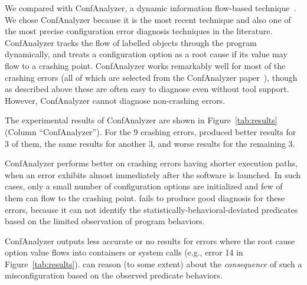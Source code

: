 We compared \ourtool with ConfAnalyzer, a dynamic information
flow-based technique~\cite{Rabkin:2011:PPC}.
We chose ConfAnalyzer because it is the most recent technique and
also one of the most precise configuration error diagnosis techniques
in the literature.
ConfAnalyzer tracks the flow of labelled objects through the
program dynamically,
and treats a configuration option as a root cause if its
value may flow to a crashing point.
ConfAnalyzer works remarkably well for most of the crashing errors (all of
which are selected from the ConfAnalyzer paper~\cite{Rabkin:2011:PPC}), though as
described above these are often easy to diagnose even without tool
support. However, ConfAnalyzer cannot diagnose non-crashing errors.

The experimental results of ConfAnalyzer are shown in Figure~\ref{tab:results} (Column ``ConfAnalyzer'').
For the 9 crashing errors, \ourtool produced better results for 3 of them,
the same results for another 3, and worse results for the remaining 3.

ConfAnalyzer performs better on crashing errors
having shorter execution paths, when an error exhibits
almost immediately after the software is launched.
In such cases, only a small number of configuration options are initialized and
few of them can flow to the crashing point. 
\ourtool fails to produce good diagnosis for these errors, because it can not identify
 the statistically-behavioral-deviated predicates based on the limited
observation of program behaviors.

ConfAnalyzer outputs less accurate or no results
for errors where the root cause option value
flows into containers or system calls (e.g., error 14 in Figure~\ref{tab:results}).
\ourtool can reason (to some extent) about the \textit{consequence} of
such a misconfiguration based on the observed predicate behaviors.
